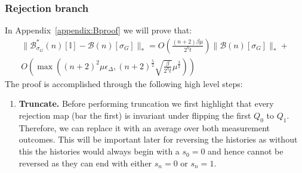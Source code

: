 \documentclass[aps,floatfix,10pt,amssymb,amsfont,amsmath,superscriptaddress,float,nofootinbib,longbibliography,nobalancelastpage,twocolumn]{revtex4-2}
\begin{document}
\subsubsection{Rejection branch}
\label{section:rejectionbranch}
In Appendix~\ref{appendix:Bproof} we will prove that:
\begin{multline}
    \|\mathcal{B}^*_{\sigma_G}(n)[\mathbb{I}] - \mathcal{B}(n)[\sigma_G]\|_* = O\left(\frac{(n+2)\beta\mu}{2^{\eta}t} \right)\|\mathcal{B}(n)[\sigma_G]\|_* +\\O\left(\max\left((n+2)^2
    \mu\epsilon_{\Delta},(n+2)^{\frac{5}{2}}\sqrt{\frac{\beta }{2^{\eta}t}}\mu^{\frac{3}{2}}\right)\right) 
    \label{eq:sumb0}
\end{multline}
The proof is accomplished through the following high level steps:
\begin{enumerate}
    \item \textbf{Truncate.} Before performing truncation we first highlight that every rejection map (bar the first) is invariant under flipping the first $Q_0$ to $Q_1$. Therefore, we can replace it with an average over both measurement outcomes. This will be important later for reversing the histories as without this the histories would always begin with a $s_0=0$ and hence cannot be reversed as they can end with either $s_n=0$ or $s_n=1$.


\end{enumerate}
\end{document}
